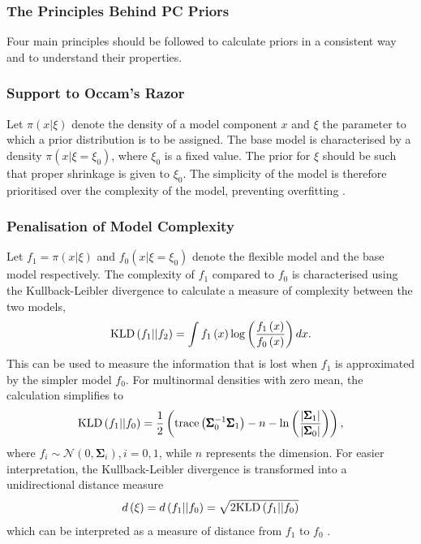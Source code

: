 \subsubsection{The Principles Behind PC Priors}
Four main principles should be followed to calculate priors in a consistent way and to understand their properties.
\subsubsection*{Support to Occam's Razor} 
Let $\pi\left(x|\xi\right)$ denote the density of a model component $x$ and $\xi$ the parameter to which a prior distribution is to be assigned. The base model is characterised by a density $\pi\left(x|\xi=\xi_0\right)$, where $\xi_0$ is a fixed value. The prior for $\xi$ should be such that proper shrinkage is given to $\xi_0$. The simplicity of the model is therefore prioritised over the complexity of the model, preventing overfitting \autocite[][]{simpson2017penalising}.
\subsubsection*{Penalisation of Model Complexity} 
Let $f_1=\pi\left(x|\xi\right)$ and $f_0\left(x|\xi=\xi_0\right)$ denote the flexible model and the base model respectively. The complexity of $f_1$ compared to $f_0$ is characterised using the Kullback-Leibler divergence \autocite[][]{kullback1951information} to calculate a measure of complexity between the two models,
\begin{equation}
    \hbox{KLD}\left(f_1||f_2\right) = \int f_1\left(x\right)\log\left(\frac{f_1\left(x\right)}{f_0\left(x\right)}\right)dx.
\end{equation}
This can be used to measure the information that is lost when $f_1$ is approximated by the simpler model $f_0$. For multinormal densities with zero mean, the calculation simplifies to
\begin{equation}
    \hbox{KLD}\left(f_1||f_0\right) = \frac{1}{2}\left(\hbox{trace}\left(\pmb{\Sigma}_0^{-1}\pmb{\Sigma}_1\right)-n-\ln\left(\frac{\left|\pmb{\Sigma}_1\right|}{\left|\pmb{\Sigma}_0\right|}\right)\right),
\end{equation}
where $f_i\sim\mathcal{N}\left(0,\pmb{\Sigma}_i\right), i=0,1$, while $n$ represents the dimension. For easier interpretation, the Kullback-Leibler divergence is transformed into a unidirectional distance measure
\begin{equation}
    d\left(\xi\right) = d\left(f_1||f_0\right)=\sqrt{2\hbox{KLD}\left(f_1||f_0\right)}
\end{equation}
which can be interpreted as a measure of distance from $f_1$ to $f_0$ \autocite[][]{simpson2017penalising}.
